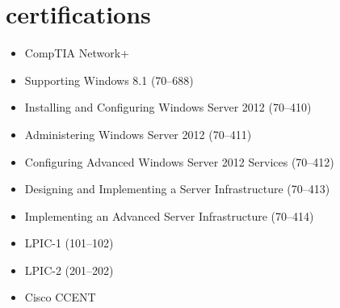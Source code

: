 \documentclass[]{friggeri-cv} %
\begin{document}
\section{certifications}
\begin{itemize}
	\item CompTIA Network+
	\item Supporting Windows 8.1 (70--688)
	\item Installing and Configuring Windows Server 2012 (70--410)
	\item Administering Windows Server 2012 (70--411)
	\item Configuring Advanced Windows Server 2012 Services (70--412)
	\item Designing and Implementing a Server Infrastructure (70--413)
	\item Implementing an Advanced Server Infrastructure (70--414)
	\item LPIC-1 (101--102)
	\item LPIC-2 (201--202)
	\item Cisco CCENT
\end{itemize}
\end{document}
